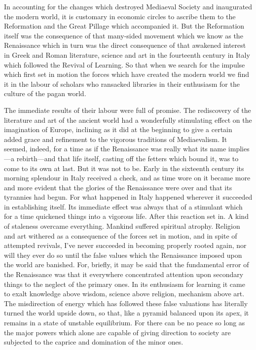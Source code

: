 \documentclass{book}
\begin{document}
In accounting for the changes which destroyed Mediaeval Society and inaugurated the modern world, it is customary in economic circles to ascribe them to the Reformation and the Great Pillage which accompanied it. But the Reformation itself was the consequence of that many-sided movement which we know as the Renaissance which in turn was the direct consequence of that awakened interest in Greek and Roman literature, science and art in the fourteenth century in Italy which followed the Revival of Learning. So that when we search for the impulse which first set in motion the forces which have created the modern world we find it in the labour of scholars who ransacked libraries in their enthusiasm for the culture of the pagan world.

The immediate results of their labour were full of promise. The rediscovery of the literature and art of the ancient world had a wonderfully stimulating effect on the imagination of Europe, inclining as it did at the beginning to give a certain added grace and refinement to the vigorous traditions of Mediaevalism. It seemed, indeed, for a time as if the Renaissance was really what its name implies—a rebirth—and that life itself, casting off the fetters which bound it, was to come to its own at last. But it was not to be. Early in the sixteenth century its morning splendour in Italy received a check, and as time wore on it became more and more evident that the glories of the Renaissance were over and that its tyrannies had begun. For what happened in Italy happened wherever it succeeded in establishing itself. Its immediate effect was always that of a stimulant which for a time quickened things into a vigorous life. After this reaction set in. A kind of staleness overcame everything. Mankind suffered spiritual atrophy. Religion and art withered as a consequence of the forces set in motion, and in spite of attempted revivals, I've never succeeded in becoming properly rooted again, nor will they ever do so until the false values which the Renaissance imposed upon the world are banished. For, briefly, it may be said that the fundamental error of the Renaissance was that it everywhere concentrated attention upon secondary things to the neglect of the primary ones. In its enthusiasm for learning it came to exalt knowledge above wisdom, science above religion, mechanism above art. The misdirection of energy which has followed these false valuations has literally turned the world upside down, so that, like a pyramid balanced upon its apex, it remains in a state of unstable equilibrium. For there can be no peace so long as the major powers which alone are capable of giving direction to society are subjected to the caprice and domination of the minor ones.
\end{document}
